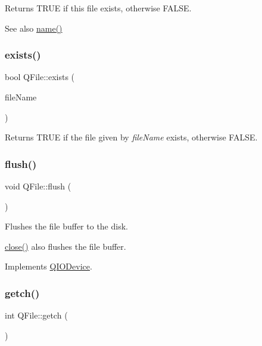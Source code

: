 Returns T\+R\+UE if this file exists, otherwise F\+A\+L\+SE. \begin{DoxySeeAlso}{See also}
\mbox{\hyperlink{class_q_file_ad14b368c041b9e2d22bbd4428f859b29}{name()}} 
\end{DoxySeeAlso}
\mbox{\label{class_q_file_a11a21bf641a2bda6fd2f992881f73f72}} 
\subsubsection{\texorpdfstring{exists()}{exists()}\hspace{0.1cm}{\footnotesize\ttfamily [2/2]}}
{\footnotesize\ttfamily bool Q\+File\+::exists (\begin{DoxyParamCaption}\item[{const \mbox{\hyperlink{class_q_string}{Q\+String}} \&}]{file\+Name }\end{DoxyParamCaption})\hspace{0.3cm}{\ttfamily [static]}}

Returns T\+R\+UE if the file given by {\itshape file\+Name} exists, otherwise F\+A\+L\+SE. \mbox{\label{class_q_file_a6d450a55bc3a8145fd33a7ee08051830}} 
\subsubsection{\texorpdfstring{flush()}{flush()}}
{\footnotesize\ttfamily void Q\+File\+::flush (\begin{DoxyParamCaption}{ }\end{DoxyParamCaption})\hspace{0.3cm}{\ttfamily [virtual]}}

Flushes the file buffer to the disk.

\mbox{\hyperlink{class_q_file_ac0d8375a5ea7d4503545d7c68dcf58e1}{close()}} also flushes the file buffer. 

Implements \mbox{\hyperlink{class_q_i_o_device_a39eccb592ae076fbc42108a3d590fb43}{Q\+I\+O\+Device}}.

\mbox{\label{class_q_file_a1c18e1a16e6f92ba8f19177824707f78}} 
\subsubsection{\texorpdfstring{getch()}{getch()}}
{\footnotesize\ttfamily int Q\+File\+::getch (\begin{DoxyParamCaption}{ }\end{DoxyParamCaption})\hspace{0.3cm}{\ttfamily [virtual]}}


